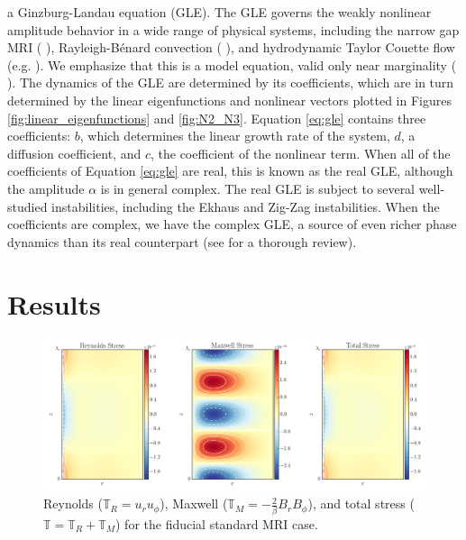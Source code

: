\documentclass{emulateapj}
\newcommand{\citei}[1]{\citeauthor{#1} \citeyear{#1}}
\begin{document}
a Ginzburg-Landau equation (GLE). The GLE governs the weakly nonlinear amplitude behavior in a wide range of physical systems, including the narrow gap MRI (\citei{Umurhan:2007hs}), Rayleigh-B\'enard convection (\citei{Newell:1969wr}), and hydrodynamic Taylor Couette flow (e.g. \citei{Recktenwald:1993}). We emphasize that this is a model equation, valid only near marginality (\citei{Cross:1993el}). The dynamics of the GLE are determined by its coefficients, which are in turn determined by the linear eigenfunctions and nonlinear vectors plotted in Figures \ref{fig:linear_eigenfunctions} and \ref{fig:N2_N3}. Equation \ref{eq:gle} contains three coefficients: $b$, which determines the linear growth rate of the system, $d$, a diffusion coefficient, and $c$, the coefficient of the nonlinear term. When all of the coefficients of Equation \ref{eq:gle} are real, this is known as the real GLE, although the amplitude $\alpha$ is in general complex. The real GLE is subject to several well-studied instabilities, including the Ekhaus and Zig-Zag instabilities. When the coefficients are complex, we have the complex GLE, a source of even richer phase dynamics than its real counterpart (see \citei{Aranson:2002} for a thorough review).


\section{Results}
\label{sec:results}
\begin{figure}
\centering
\includegraphics[width=\textwidth]{../figures/fiducial_standard_mri_stressplot_Pm_16E-7.png}
\caption{Reynolds ($\mathbb{T}_{R} = u_r u_\phi$), Maxwell ($\mathbb{T}_{M} = -\frac{2}{\beta} B_r B_\phi$), and total stress ($\mathbb{T} = \mathbb{T}_{R} + \mathbb{T}_{M}$) for the fiducial standard MRI case. }
\end{figure}
\end{document}
